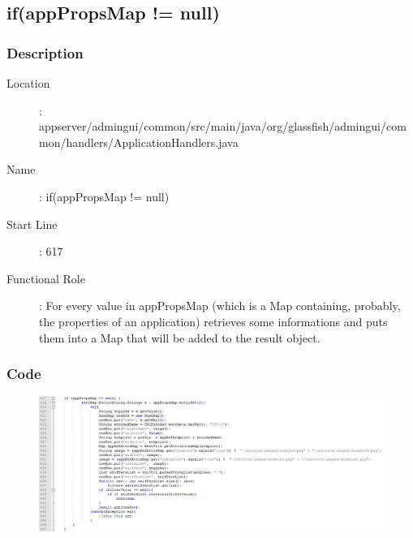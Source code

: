 	\subsection{if(appPropsMap != null)}
		\subsubsection{Description}
		\begin{description}
		\item[Location]: appserver/admingui/common/src/main/java/org/glassfish/admingui/common/handlers/ApplicationHandlers.java
		\item[Name]: if(appPropsMap != null)
		\item[Start Line]: 617
		\item[Functional Role]: For every value in appPropsMap (which is a Map containing, probably,
		the properties of an application) retrieves some informations and puts them into a Map that will be
		added to the result object.
		\end{description}
		\subsubsection{Code}
		\begin{figure}[h!]
			\includegraphics[width=\textwidth]{../SE2_CODE/ifapppropsmap}
		\end{figure}
